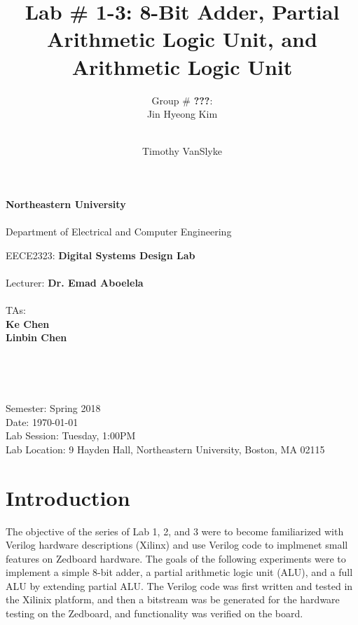 \documentclass[12pt, letterpaper]{article}
\title{Lab \# 1-3: \textbf{8-Bit Adder, Partial Arithmetic Logic Unit, and Arithmetic Logic Unit}}
\author{Group \# \textbf{\color{red}???}:\\ Jin Hyeong Kim \and\\ Timothy VanSlyke}
\begin{document}
\begin{titlepage}
	\begin{center}
		{\Large
			\textbf{Northeastern University}\\
			~\\
			Department of Electrical and Computer Engineering\\ 
		}

		\vfill

		{\large
			EECE2323: \textbf{Digital Systems Design Lab}\\
			~\\
			Lecturer: \textbf{Dr. Emad Aboelela}\\
			~\\
			TAs:\\
			\textbf{Ke Chen}\\
			\textbf{Linbin Chen}\\
		}
	
		\vfill

		{\Large \thetitle}\\
	
		\vfill

		{\large \theauthor}\\

		\vfill

		{\large
			Semester: Spring 2018\\
			Date: \today\\
			Lab Session: Tuesday, 1:00PM\\ 
			Lab Location: 9 Hayden Hall, Northeastern University, Boston, MA 02115\\
		}

	\end{center}
\end{titlepage}

\tableofcontents

\newpage
\section{Introduction}
\begin{flushleft}
\doublespacing The objective of the series of Lab 1, 2, and 3 were to become familiarized with Verilog hardware descriptions (Xilinx) and use Verilog code to implmenet small features on Zedboard hardware. The goals of the following experiments were to implement a simple 8-bit adder, a partial arithmetic logic unit (ALU), and a full ALU by extending partial ALU. The Verilog code was first written and tested in the Xilinix platform, and then a bitstream was be generated for the hardware testing on the Zedboard, and functionality was verified on the board.
\end{flushleft}
\end{document}
